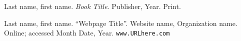 \documentclass[letterpaper, 11pt]{article}
\newcommand{\1}{\mathds{1}}	%
\theoremstyle{definition}
\begin{document}


\begin{thebibliography}{2}

  Last name, first name.
  \textit{Book Title}.
  Publisher, Year.
  Print.

  Last name, first name. ``Webpage Title''.
  Website name, Organization name.
  Online; accessed Month Date, Year. 
  \texttt{www.URLhere.com}

\end{thebibliography}

\end{document}
